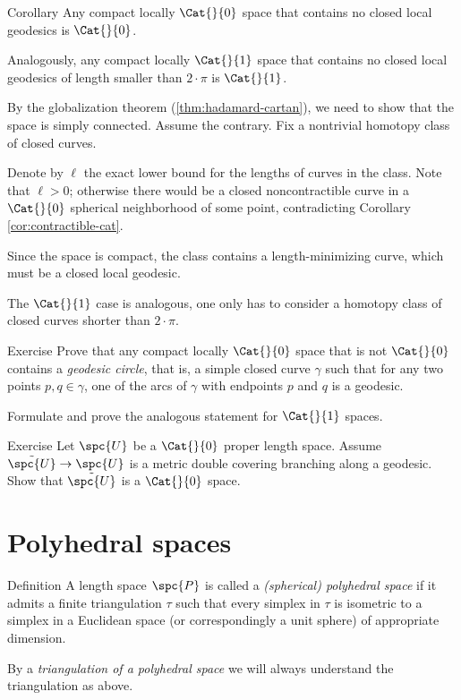 \begin{thm}{Corollary}\label{cor:closed-geod-cat} 
Any compact locally $\Cat{}{0}$ space that contains no closed local geodesics is $\Cat{}{0}$.
 
Analogously, any compact locally $\Cat{}{1}$ space that  contains no closed local geodesics of length smaller than $2\cdot\pi$ is $\Cat{}{1}$.
\end{thm}

By the globalization theorem (\ref{thm:hadamard-cartan}), we need to show that the space is simply connected.
Assume the contrary. 
Fix a nontrivial homotopy class of closed curves.

Denote by $\ell$ the exact lower bound for the lengths of curves in the class.
Note that $\ell>0$;
otherwise there would be a closed noncontractible curve in a $\Cat{}{0}$ spherical neighborhood of some point, contradicting Corollary \ref{cor:contractible-cat}.

Since the space is compact, the class contains a length-minimizing curve, 
which must be a closed local geodesic. 

The $\Cat{}{1}$ case is analogous, one only has to consider a homotopy class of closed curves shorter than $2\cdot\pi$.
\qeds

\begin{thm}{Exercise}\label{ex:geod-circle}
Prove that any compact locally $\Cat{}{0}$ space that is not $\Cat{}{0}$  contains a \emph{geodesic circle}, 
that is, a simple closed curve $\gamma$ such that 
for any two points $p,q\in\gamma$, one of the arcs of $\gamma$ with endpoints $p$ and $q$ is a  geodesic.

Formulate and prove the analogous statement  for  $\Cat{}{1}$ spaces.
\end{thm}

\begin{thm}{Exercise}\label{ex:branching-cover} 
Let $\spc{U}$ be a $\Cat{}{0}$ proper length space.
Assume $\tilde{\spc{U}}\to \spc{U}$ is a metric  double covering branching along a geodesic.
Show that $\tilde{\spc{U}}$ is a $\Cat{}{0}$ space.
\end{thm}

\section{Polyhedral spaces}

\begin{thm}{Definition}\label{def:poly}
A length space $\spc{P}$ is called  
a \emph{(spherical) polyhedral space} 
if it admits a finite triangulation $\tau$ 
such that every simplex in $\tau$ is isometric to a simplex in a Euclidean space (or correspondingly a unit sphere) of appropriate dimension.

By a 
\emph{triangulation of a polyhedral space} 
we will always understand the triangulation as above. 
\end{thm}


